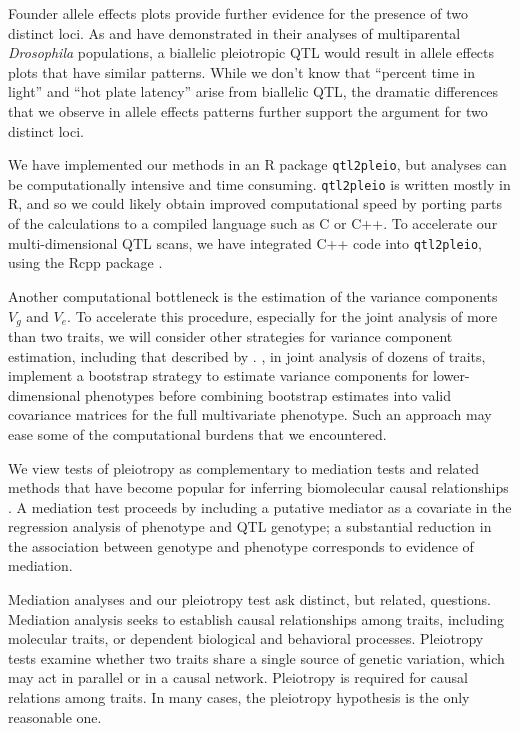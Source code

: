 \documentclass[oneside]{book}\usepackage[]{graphicx}\usepackage[]{color}
\begin{document}
Founder allele effects plots provide further evidence for the presence
of two distinct loci. As \citet{macdonald2007joint} and
\citet{king2012genetic} have demonstrated in their analyses of multiparental
\emph{Drosophila} populations, a biallelic pleiotropic QTL would result in
allele effects plots that have similar patterns. While we don't know
that ``percent time in light'' and ``hot plate latency'' arise from
biallelic QTL, the dramatic differences that we observe in allele
effects patterns further support the argument for two distinct loci.

We have implemented our methods in an R package
\texttt{qtl2pleio}, but analyses can be computationally intensive and
time consuming. \texttt{qtl2pleio} is written mostly in R, and so we
could likely obtain improved computational speed by porting parts of
the calculations to a compiled language such as C or C++.
To accelerate our multi-dimensional QTL
scans, we have integrated C++ code into \texttt{qtl2pleio},
using the Rcpp package \citep{eddelbuettel2011rcpp}.

Another computational bottleneck is the estimation of the variance
components $V_g$ and $V_e$. To accelerate this procedure, 
especially for the joint analysis of more than two traits, we will
consider other strategies for variance component estimation, including
that described by \citet{hannah2018limmbo}. \citet{hannah2018limmbo}, in joint analysis of dozens of traits, implement a bootstrap
strategy to estimate variance components for lower-dimensional
phenotypes before combining bootstrap estimates
into valid covariance matrices for the full multivariate phenotype. 
Such an approach may ease some of the computational burdens that we encountered.


We view tests of pleiotropy as complementary to 
mediation tests and related methods that have become popular for
inferring biomolecular causal relationships
\citep{chick2016defining,schadt2005integrative,baron1986moderator}. A
mediation test proceeds by including a putative mediator as a
covariate in the regression analysis of phenotype and QTL genotype;
a substantial reduction in the association between
genotype and phenotype corresponds to evidence of mediation. 


Mediation analyses and our pleiotropy test ask distinct, but related, questions. Mediation analysis seeks to establish causal relationships among traits, including molecular traits, or dependent biological and behavioral processes. Pleiotropy tests examine whether two traits share a single source of genetic variation, which may act in parallel or in a causal network. Pleiotropy is required for causal relations among traits. In many cases, the pleiotropy hypothesis is the only reasonable one. 
\end{document}
